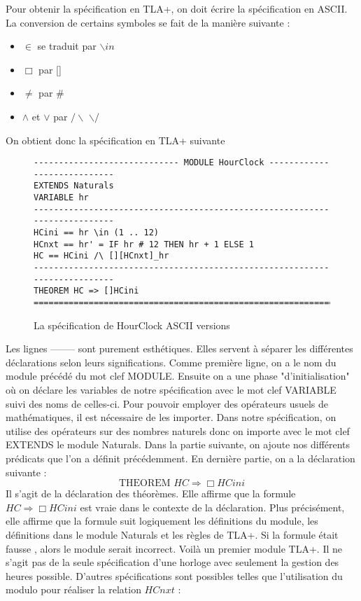 \documentclass[12pt,a4paper]{article}
\begin{document}
Pour obtenir la spécification en TLA+, on doit écrire la spécification en ASCII. La conversion de certains symboles se fait de la manière suivante :

\begin{itemize}
	\item $\in$ se traduit par $\backslash in$
	\item $\Box$ par []
	\item $\neq$ par \#
	\item $\land$ et $\lor$ par $/ \backslash$ $\backslash /$ 
\end{itemize}

On obtient donc la spécification en TLA+ suivante

\begin{figure}[ht]
\begin{lstlisting}[frame=single, basicstyle=\footnotesize]
----------------------------- MODULE HourClock ----------------------------
EXTENDS Naturals
VARIABLE hr
---------------------------------------------------------------------------
HCini == hr \in (1 .. 12)
HCnxt == hr' = IF hr # 12 THEN hr + 1 ELSE 1
HC == HCini /\ [][HCnxt]_hr
---------------------------------------------------------------------------
THEOREM HC => []HCini
===========================================================================

\end{lstlisting}
\caption{La spécification de HourClock ASCII versions}
\end{figure}

Les lignes -------- sont purement esthétiques. Elles servent à séparer les différentes déclarations selon leurs significations. Comme première ligne, on a le nom du module précédé du mot clef MODULE.
Ensuite on a une phase "d'initialisation" où on déclare les variables de notre spécification avec le mot clef VARIABLE suivi des noms de celles-ci. Pour pouvoir employer des opérateurs usuels de mathématiques, il est nécessaire de les importer. Dans notre spécification, on utilise des opérateurs sur des nombres naturels donc on importe avec le mot clef EXTENDS le module Naturals.
Dans la partie suivante, on ajoute nos différents prédicats que l'on a définit précédemment.
En dernière partie, on a la déclaration suivante :
$$ \text{THEOREM } HC \Rightarrow \Box HCini$$
Il s'agit de la déclaration des théorèmes. Elle affirme que la formule $HC \Rightarrow \Box HCini$ est vraie dans le contexte de la déclaration. Plus précisément, elle affirme que la formule suit logiquement les définitions du module, les définitions dans le module Naturals et les règles de TLA+. Si la formule était fausse , alors le module serait incorrect.
Voilà un premier module TLA+. Il ne s'agit pas de la seule spécification d'une horloge avec seulement la gestion des heures possible. D'autres spécifications sont possibles telles que l'utilisation du modulo pour réaliser la relation $HCnxt$ :
\end{document}
